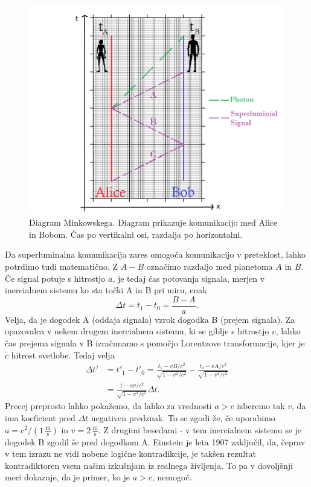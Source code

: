 \documentclass[12pt]{article}
\begin{document}
\begin{figure}[H]
\includegraphics[width=12cm]{special-relativity.png}
\centering
\caption{Diagram Minkowskega. Diagram prikazuje komunikacijo med Alice in Bobom. Čas po vertikalni osi, razdalja po horizontalni. \cite{marcocerezoEntanglementHowIt2015}}
\label{fig:minkowski}
\end{figure}

\par
Da superluminalna komunikacija zares omogoča komunikacijo v preteklost, lahko potrdimo tudi matematično. Z $A - B$ označimo razdaljo med planetoma $A$ in $B$. Če signal potuje s hitrostjo $a$, je tedaj čas potovanja signala, merjen v inercialnem sistemu ko sta točki A in B pri miru, enak 
\begin{equation} \label{eq2}
\Delta t=t_{1}-t_{0}=\frac{B-A}{a}.
\end{equation}
Velja, da je dogodek A (oddaja signala) vzrok dogodka B (prejem signala). Za opazovalca v nekem drugem inercialnem sistemu, ki se giblje s hitrostjo $v$, lahko čas prejema signala v B izračunamo s pomočjo Lorentzove transformacije, kjer je $c$ hitrost svetlobe. Tedaj velja 
\begin{equation} \label{eq3}
\begin{split}
\Delta t' & =t'_{1}-t'_{0}=\frac{t_{1}-vB/c^{2}}{\sqrt{1-v^{2}/c^{2}}}-\frac{t_{0}-vA/c^{2}}{\sqrt{1-v^{2}/c^{2}}}\\
 & =\frac{1-av/c^{2}}{\sqrt{1-v^{2}/c^{2}}}\Delta t.
\end{split}
\end{equation}
Precej preprosto lahko pokažemo, da lahko za vrednosti $a > c$ izberemo tak $v$, da ima koeficient pred $\Delta t$ negativen predznak. To se zgodi že, če uporabimo $a = c^2 / (1 \, \frac{\text{m}}{\text{s}}) $ in $v = 2 \, \frac{\text{m}}{\text{s}}$. Z drugimi besedami - v tem inercialnem sistemu se je dogodek B zgodil še pred dogodkom A. Einstein je leta 1907 zaključil, da, čeprav v tem izrazu ne vidi nobene logične kontradikcije, je takšen rezultat kontradiktoren vsem našim izkušnjam iz realnega življenja. To pa v dovoljšnji meri dokazuje, da je primer, ko je $a > c$, nemogoč. \cite{TachyonicAntitelephone2022a}
\end{document}
